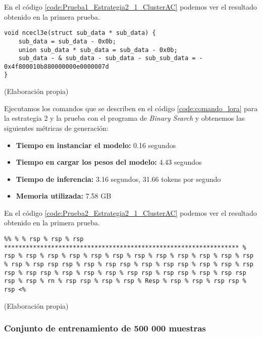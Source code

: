 En el código \ref{code:Prueba1_Estrategia2_1_ClusterAC} podemos ver el resultado obtenido
en la primera prueba.

\begin{mycode}
    \begin{verbatim}
void ncecl3e(struct sub_data * sub_data) { 
    sub_data = sub_data - 0x0b; 
    union sub_data * sub_data = sub_data - 0x0b; 
    sub_data - & sub_data - sub_data - sub_sub_data = - 0x4f800010b880000000e0000007d
}
    \end{verbatim}
    \caption[]{ (Elaboración propia)}
    \label{code:Prueba1_Estrategia2_1_ClusterAC}
\end{mycode}

Ejecutamos los comandos que se describen en el código \ref{code:comando_lora} para
la estrategia 2 y la prueba con el programa de \textit{Binary Search} y obtenemos
las siguientes métricas de generación:

\begin{itemize}
    \item \textbf{Tiempo en instanciar el modelo:} 0.16 segundos
    \item \textbf{Tiempo en cargar los pesos del modelo:} 4.43 segundos
    \item \textbf{Tiempo de inferencia:} 3.16 segundos, 31.66 tokens por segundo
    \item \textbf{Memoria utilizada:} 7.58 GB
\end{itemize}

En el código \ref{code:Prueba2_Estrategia2_1_ClusterAC} podemos ver el resultado obtenido
en la primera prueba.

\begin{mycode}
    \begin{verbatim}
%% % % rsp % rsp % rsp ***************************************************************** % rsp % rsp % rsp % rsp % rsp % rsp % rsp % rsp % rsp % rsp % rsp % rsp % rsp % rsp rsp rsp % rsp % rsp rsp % rsp % rsp rsp % rsp % rsp % rsp rsp % rsp rsp % rsp % rsp % rsp % rsp rsp % rsp rsp % rsp % rsp rsp rsp % rsp % rn % rsp rsp % rsp % rsp % Resp % rsp % rsp % rsp rsp % rsp <%
    \end{verbatim}
    \caption[]{ (Elaboración propia)}
    \label{code:Prueba2_Estrategia2_1_ClusterAC}
\end{mycode}

\subsubsection{Conjunto de entrenamiento de 500 000 muestras}

